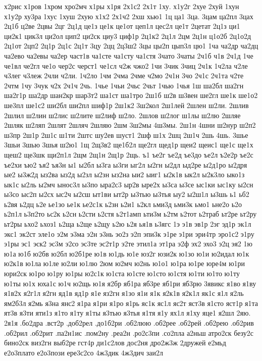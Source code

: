 {х2рис
х1ров
1хром
хро2мч
х1ры
х1ря
2х1с2
2х1т
1ху.
х1у2г
2хуе
2хуй
1хун
х1у2р
ху3ра
1хус
1хуш
2хую
х1х2
2х1ч2
2хш
хью1
1ц
ца1
3ца.
3цам
ца2пл
3цах
2ц1б
ц2ве
2цвы
2цг
2ц1д
це1з
це1к
це1от
цеп1л
цес2л
це1т
2цетат
2ц1з
ци1
ци2к1
цик3л
ци2ол
цип2
ци2ск
циу3
циф1р
2ц1к2
2ц1л
2цм
2ц1н
ц1о2б
2ц1о2д
2ц1от
2цп2
2ц1р
2ц1с
2ц1т
3цу
2цц
2ц3ш2
3цы
цы2п
цып3л
цю1
1ча
ча2др
ча2дц
ча2ево
ча2евы
ча2ер
част1в
ча1сте
ча1сту
ча1стя
3чато
3чаты
2ч1б
ч1в
2ч1д
1че
че1вл
че2гл
че1о
чер2с
черст1
че1сл
ч2ж
чжо2
1чи
3чик
3чиц
2ч1к
1ч2ла
ч2ле
ч3лег
ч3леж
2чли
ч2ли.
1ч2ло
1чм
2чма
2чме
ч2мо
2ч1н
3чо
2ч1с
2ч1та
ч2те
2чтм
1чу
3чук
ч2х
2ч1ч
2чь.
1чье
1чьи
2чьс
2чьт
1чью
1чья
1ш
ша2бл
ша2гн
ша2г1р
ша2др
шан2кр
шар3т2
ша1ст
ша1тро
2ш1б
ш2в
ш3вен
ше2гл
ше1к
ше1о2
ше3пл
ше1с2
ши2бл
ши2пл
шиф1р
2ш1к2
3ш2кол
2ш1лей
2шлен
ш2ли.
2шлив
2шлил
ш2лин
ш2лис
ш2лите
ш2лиф
ш2ло.
2шлов
ш2лог
ш1лы
ш2лю
2шляе
2шляк
ш2ляп
2шлят
2шляч
2шляю
2шм
3ш2мы
4ш3мы.
2ш1н
4шни
ш2нур
ш2п2
ш3пр
2ш1р
2ш1с
ш1ти
2штс
шу2ев
шуст1
2шф
ш1х
2шц
2ш1ч
2шь
4шь.
3шье
3шьи
3шью
3шья
ш2ю1
1щ
2щ3в2
ще1б2л
ще2гл
щед1р
щеи2
щеис1
ще1с
ще1х
щеш2
ще3шк
щи2п1л
2щм
2щ1н
2щ1р
2щь.
ъ1
ъе2г
ъе2д
ъе3до
ъе2л
ъ2е2р
ъе2с
ъе2хи
ъю2
ъя2
ъя3н
ы1
ы2бл
ы3га
ы3ги
ыг2л
ы2гн
ы2дл
ыд2ре
ы2д1ро
ы2дря
ые2
ы3ж2д
ыз2ва
ыз2д
ы2зл
ы2зн
ыз2на
ыи2
ыиг1
ы2к1в
ык2л
ы2к3ло
ыко1з
ык1с
ы2ль
ы2мч
ынос3л
ы3по
ыра2с3
ыр2в
ыре2х
ы3са
ы3се
ыс1ки
ыс1ку
ы2сн
ы3со
ыс2п
ы2сх
ыс2ч
ы2сш
ыт1ви
ыт2р
ы3тью
ы3тья
ыу2
ы2ш1л
ы3шь
ь1
ьб2
ь2вя
ь2дц
ь2е
ье1зо
ье1к
ье2с1к
ь2зн
ь2и1
ь2кл
ьми3д
ьми3к
ьмо1
ьне2о
ь2о
ь2п1л
ь3п2то
ьс2к
ь2сн
ь2сти
ь2стя
ь2т1амп
ьти3м
ь2тм
ь2тот
ь2траб
ьт2ре
ьт2ру
ьт2ры
ьхо2
ьхоз1
ь2ща
ь2ще
ь2щу
ь2ю
ь2я
ья1в
ь3ягс
1э
э1в
эв1р
2эг
эд1р
эк1л
экс1
эк2ст
эле1о
э2м
э3ма
э2н
э3нь
эо2з
э2п
эпи3к
э1ре
э1ри
эри4тр
эро1с2
э1ру
э1ры
эс1
эск2
эс3м
э2со
эс3те
эс2т1р
э2те
этил1а
эт1ра
э2ф
эх2
эхо3
э2ц
эя2
1ю
ю1а
ю1б
ю2бв
ю2бл
ю2б1ре
ю1в
ю1дь
ю1е
юз2г
юзи2к
ю1зо
ю1и
ю2идал
ю1к
ю2к1в
ю1ла
ю1ле
ю2ли
ю1лю
2юм
ю2мч
ю2нь
ю1о1
ю1ра
ю1ре
юре4м
ю1ри
юри2ск
ю1ро
ю1ру
ю1ры
ю2с1к
ю1ста
ю1сте
ю1сто
ю1стя
ю1ти
ю1то
ю1ту
ю1ты
ю1х
юха1с
ю1ч
ю2щь
ю1я
я2бр
яб1ра
яб3ре
яб1ри
яб3рю
3явикс
я1во
я1ву
я1в2х
я2г1л
я2гн
яд1в
яд1р
я1е
яз2гн
я1зо
я1и
я1к
я2к1в
я2к1л
як1с
я1л
я2ль
ям2б3л
я2мь
я3на
янс2
я1ра
я1ри
я1ро
я1рь
яс1к
яс1л
яс2т
яст3в
я1сто
яст1р
я1та
ят3в
я3ти
яти1з
я1то
я1ту
я1ты
я3тью
я3тья
я1тя
я1у
ях1л
я1ху
яце1
я2шл
2яю.
2я1я
%
.бо2дра
.вст2р
.доб2рел
.до1б2ри
.об2люю
.об2рее
.об2рей
.об2рею
.об2рив
.об2рил
.об2рит
.па2н1ис
.пом2ну
.реа2н
.ро2с3пи
.со2пла
а2ньш
атро2ск
безу2с
бино2ск
виз2гн
выб2ре
гст4р
ди1с2лов
дос2ня
дро2ж3ж
2дружей
е2мьд
е2о3плато
е2о3пози
ере3с2со
4ж3дик
4ж3дич
заи2л
}
